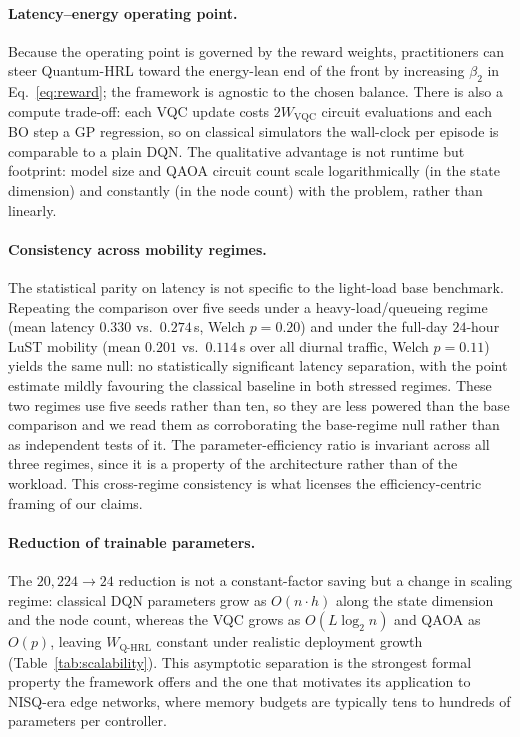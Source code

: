 \documentclass[11pt,a4paper]{article}
\theoremstyle{definition}
\begin{document}
\paragraph{Latency--energy operating point.}
Because the operating point is governed by the reward weights, practitioners can steer Quantum-HRL toward the energy-lean end of the front by increasing $\beta_2$ in Eq.~\eqref{eq:reward}; the framework is agnostic to the chosen balance. There is also a compute trade-off: each VQC update costs $2W_{\mathrm{VQC}}$ circuit evaluations and each BO step a GP regression, so on classical simulators the wall-clock per episode is comparable to a plain DQN. The qualitative advantage is not runtime but footprint: model size and QAOA circuit count scale logarithmically (in the state dimension) and constantly (in the node count) with the problem, rather than linearly.

\paragraph{Consistency across mobility regimes.}
The statistical parity on latency is not specific to the light-load base benchmark. Repeating the comparison over five seeds under a heavy-load/queueing regime (mean latency $0.330$ vs.\ $0.274$\,s, Welch $p=0.20$) and under the full-day $24$-hour LuST mobility (mean $0.201$ vs.\ $0.114$\,s over all diurnal traffic, Welch $p=0.11$) yields the same null: no statistically significant latency separation, with the point estimate mildly favouring the classical baseline in both stressed regimes. These two regimes use five seeds rather than ten, so they are less powered than the base comparison and we read them as corroborating the base-regime null rather than as independent tests of it. The parameter-efficiency ratio is invariant across all three regimes, since it is a property of the architecture rather than of the workload. This cross-regime consistency is what licenses the efficiency-centric framing of our claims.

\paragraph{Reduction of trainable parameters.}
The $20{,}224 \rightarrow 24$ reduction is not a constant-factor saving but a change in scaling regime: classical DQN parameters grow as $O(n\cdot h)$ along the state dimension and the node count, whereas the VQC grows as $O(L\log_2 n)$ and QAOA as $O(p)$, leaving $W_{\mathrm{Q\text{-}HRL}}$ constant under realistic deployment growth (Table~\ref{tab:scalability}). This asymptotic separation is the strongest formal property the framework offers and the one that motivates its application to NISQ-era edge networks, where memory budgets are typically tens to hundreds of parameters per controller.
\end{document}
